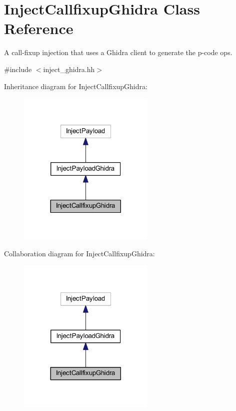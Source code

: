 \hypertarget{class_inject_callfixup_ghidra}{}\section{Inject\+Callfixup\+Ghidra Class Reference}
\label{class_inject_callfixup_ghidra}


A call-\/fixup injection that uses a Ghidra client to generate the p-\/code ops.  




{\ttfamily \#include $<$inject\+\_\+ghidra.\+hh$>$}



Inheritance diagram for Inject\+Callfixup\+Ghidra\+:
\nopagebreak
\begin{figure}[H]
\begin{center}
\leavevmode
\includegraphics[width=185pt]{class_inject_callfixup_ghidra__inherit__graph}
\end{center}
\end{figure}


Collaboration diagram for Inject\+Callfixup\+Ghidra\+:
\nopagebreak
\begin{figure}[H]
\begin{center}
\leavevmode
\includegraphics[width=185pt]{class_inject_callfixup_ghidra__coll__graph}
\end{center}
\end{figure}
